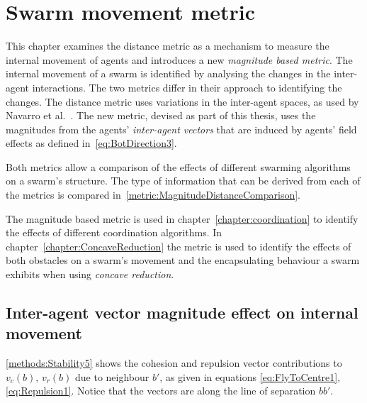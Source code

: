 \chapter{Swarm movement metric}\label{chapter:metric}
This chapter examines the distance metric as a mechanism to measure the internal movement of agents and introduces a new \textit{magnitude based metric}. The internal movement of a swarm is identified by analysing the changes in the inter-agent interactions. The two metrics differ in their approach to identifying the changes. The distance metric uses variations in the inter-agent spaces, as used by Navarro et al.~\cite{NIM:09}. The new metric, devised as part of this thesis, uses the magnitudes from the agents' \textit{inter-agent vectors} that are induced by agents' field effects as defined in~\autoref{eq:BotDirection3}. 

Both metrics allow a comparison of the effects of different swarming algorithms on a swarm's structure. The type of information that can be derived from each of the metrics is compared in~\autoref{metric:MagnitudeDistanceComparison}.

The magnitude based metric is used in chapter~\ref{chapter:coordination} to identify the effects of different coordination algorithms. In chapter~\ref{chapter:ConcaveReduction} the metric is used to identify the effects of both obstacles on a swarm's movement and the encapsulating behaviour a swarm exhibits when using \textit{concave reduction}.
 

\section{Inter-agent vector magnitude effect on internal movement}\label{Section:StabilityMagnitude}
\autoref{methods:Stability5} shows the cohesion and repulsion vector contributions to $v_c(b)$, $v_r(b)$ due to neighbour $b'$, as given in equations \ref{eq:FlyToCentre1}, \ref{eq:Repulsion1}. Notice that the vectors are along the line of separation $bb'$. 

